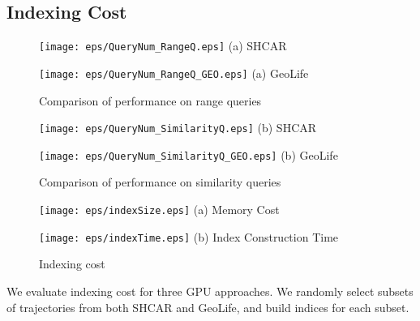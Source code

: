 \documentclass[10pt,conference,letterpaper]{IEEEtran}
\begin{document}
\subsection{Indexing Cost}

\begin{figure}[!t]
	\centering
	\scriptsize{
		\begin{minipage}{0.48\linewidth}
			\centering
			\texttt{[image: eps/QueryNum\_RangeQ.eps]}
			(a) SHCAR
		\end{minipage}
		\hfill
		\begin{minipage}{0.48\linewidth}
			\centering
			\texttt{[image: eps/QueryNum\_RangeQ\_GEO.eps]}
			(a) GeoLife
		\end{minipage}	
	}
	\caption{Comparison of performance on range queries \label{fig:QueryNum_range}}
	\vspace{-.1in}
\end{figure}

\begin{figure}[!t]\centering
	\scriptsize{
		\begin{minipage}{0.48\linewidth}
			\centering
			\texttt{[image: eps/QueryNum\_SimilarityQ.eps]}
			(b) SHCAR
		\end{minipage}
		\hfill
		\begin{minipage}{0.48\linewidth}
			\centering
			\texttt{[image: eps/QueryNum\_SimilarityQ\_GEO.eps]}
			(b) GeoLife
		\end{minipage}
	}
	\caption{Comparison of performance on similarity queries \label{fig:QueryNum_sim}}
	\vspace{-.1in}
\end{figure}
\begin{figure}[!t]\centering
	\scriptsize{
		\begin{minipage}{0.48\linewidth}
			\centering
			\texttt{[image: eps/indexSize.eps]}
			(a) Memory Cost
		\end{minipage}
		\hfill
		\begin{minipage}{0.48\linewidth}
			\centering
			\texttt{[image: eps/indexTime.eps]}
			(b) Index Construction Time
		\end{minipage}
	}
	\caption{Indexing cost\label{fig:IndexCost}}
	\vspace{-.1in}
\end{figure}

We evaluate indexing cost for three GPU approaches. We randomly select subsets of trajectories from both SHCAR and GeoLife, and build indices for each subset.
\end{document}
